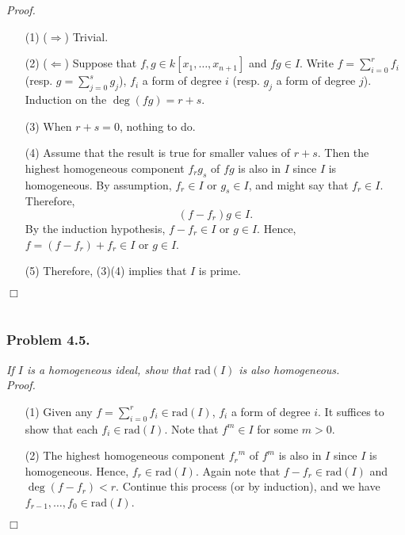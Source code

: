 \documentclass{article}
\begin{document}
\emph{Proof.}
\begin{enumerate}
\item[(1)]
  ($\Longrightarrow$) Trivial.

\item[(2)]
  ($\Longleftarrow$) Suppose that $f, g \in k[x_1,\ldots,x_{n+1}]$ and $fg \in I$.
  Write $f = \sum_{i=0}^{r} f_i$ (resp. $g = \sum_{j=0}^{s} g_j$),
  $f_i$ a form of degree $i$ (resp. $g_j$ a form of degree $j$).
  Induction on the $\deg(fg) = r + s$.

\item[(3)]
  When $r + s = 0$, nothing to do.

\item[(4)]
  Assume that the result is true for smaller values of $r + s$.
  Then the highest homogeneous component $f_r g_s$ of $fg$ is also in $I$
  since $I$ is homogeneous.
  By assumption, $f_r \in I$ or $g_s \in I$, and might say that $f_r \in I$.
  Therefore,
  \[
    (f - f_r)g \in I.
  \]
  By the induction hypothesis, $f - f_r \in I$ or $g \in I$.
  Hence, $f = (f - f_r) + f_r \in I$ or $g \in I$.

\item[(5)]
  Therefore, (3)(4) implies that $I$ is prime.
\end{enumerate}
$\Box$ \\\\






\subsubsection*{Problem 4.5.}
\emph{If $I$ is a homogeneous ideal, show that $\mathrm{rad}(I)$ is also homogeneous.} \\



\emph{Proof.}
\begin{enumerate}
\item[(1)]
  Given any $f = \sum_{i=0}^{r} f_i \in \mathrm{rad}(I)$, $f_i$ a form of degree $i$.
  It suffices to show that each $f_i \in \mathrm{rad}(I)$.
  Note that $f^{m} \in I$ for some $m > 0$.

\item[(2)]
  The highest homogeneous component ${f_r}^m$ of $f^{m}$ is also in $I$
  since $I$ is homogeneous.
  Hence, $f_r \in \mathrm{rad}(I)$.
  Again note that $f - f_r \in \mathrm{rad}(I)$ and $\deg(f - f_r) < r$.
  Continue this process (or by induction), and we have
  $f_{r-1}, \ldots, f_0 \in \mathrm{rad}(I)$.
\end{enumerate}
$\Box$ \\\\
\end{document}
